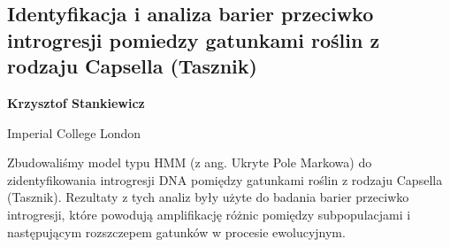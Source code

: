\documentclass[\main/boa.tex]{subfiles}
\begin{document}
\subsection{Identyfikacja i analiza barier przeciwko introgresji pomiedzy gatunkami roślin z rodzaju Capsella (Tasznik)}

\begin{minipage}{0.915\textwidth}
	\centering
  {\bf {} Krzysztof Stankiewicz}
\end{minipage}

\vskip 0.3cm

\begin{affiliations}
\begin{minipage}{0.915\textwidth}
\centering
Imperial College London \\[-2pt]
\end{minipage}
\end{affiliations}

\vskip 0.8cm

Zbudowaliśmy model typu HMM (z ang. Ukryte Pole Markowa) do zidentyfikowania introgresji DNA pomiędzy gatunkami roślin z rodzaju Capsella (Tasznik). Rezultaty z tych analiz były użyte do badania barier przeciwko introgresji, które powodują amplifikację różnic pomiędzy subpopulacjami i następującym rozszczepem gatunków w procesie ewolucyjnym.
\end{document}
